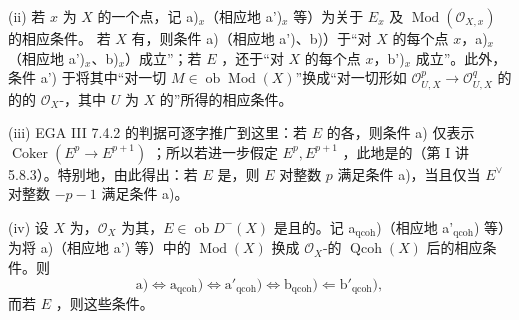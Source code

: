 (ii) 若 $x$ 为 $X$ 的一个点，记 a)$_x$（相应地 a')$_x$ 等）为关于 $E_x$ 及 $\operatorname{Mod}(\mathcal O_{X,x})$ 的相应条件。
若 $X$ 有，则条件 a)（相应地 a')、b)）于“对 $X$ 的每个点 $x$，a)$_x$（相应地 a')$_x$、b)$_x$）成立”；若 $E$ ，还于“对 $X$ 的每个点 $x$，b')$_x$ 成立”。此外，条件 a') 于将其中“对一切 $M\in\operatorname{ob}\operatorname{Mod}(X)$”换成“对一切形如 $\mathcal O_{U,X}^{p}\to\mathcal O_{U,X}^{q}$ 的的的 $\mathcal O_X$-，其中 $U$ 为 $X$ 的”所得的相应条件。

(iii) EGA III 7.4.2 的判据可逐字推广到这里：若 $E$ 的各，则条件 a) 仅表示 $\operatorname{Coker}(E^p\to E^{p+1})$ ；所以若进一步假定 $E^p,E^{p+1}$ ，此地是的（第 I 讲 5.8.3）。特别地，由此得出：若 $E$ 是，则 $E$ 对整数 $p$ 满足条件 a)，当且仅当 $E^\vee$ 对整数 $-p-1$ 满足条件 a)。

(iv) 设 $X$ 为，$\mathcal O_X$ 为其，$E\in\operatorname{ob}D^-(X)$ 是且的。记 a$_{\mathrm{qcoh}}$)（相应地 a'$_{\mathrm{qcoh}}$) 等）为将 a)（相应地 a') 等）中的 $\operatorname{Mod}(X)$ 换成 $\mathcal O_X$-的 $\operatorname{Qcoh}(X)$ 后的相应条件。则
\[
\text{a)}\Longleftrightarrow\text{a}_{\mathrm{qcoh}}\text{)}
\Longleftrightarrow\text{a}'_{\mathrm{qcoh}}\text{)}
\Longleftrightarrow\text{b}_{\mathrm{qcoh}}\text{)}
\Longleftarrow\text{b}'_{\mathrm{qcoh}}\text{)},
\]
而若 $E$ ，则这些条件。

